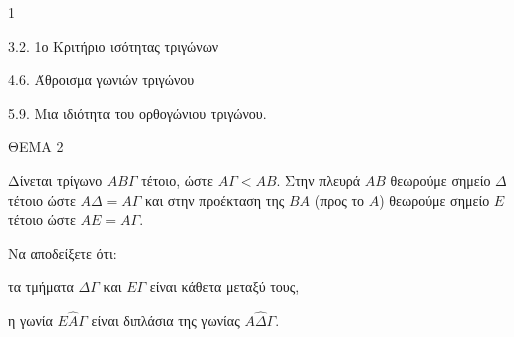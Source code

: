 \begin{ylh}{1}
    \item 3.2. 1ο Κριτήριο ισότητας τριγώνων
    \item 4.6. Άθροισμα γωνιών τριγώνου
    \item 5.9. Μια ιδιότητα του ορθογώνιου τριγώνου.
\end{ylh}

ΘΕΜΑ 2

Δίνεται τρίγωνο $ΑΒ\Gamma$ τέτοιο, ώστε $A\Gamma < AB$. Στην πλευρά $AB$ θεωρούμε σημείο $\Delta$ τέτοιο ώστε $A\Delta = A\Gamma$ και στην προέκταση της $BA$ (προς το $A$) θεωρούμε σημείο $E$ τέτοιο ώστε $AE = A\Gamma$.

Να αποδείξετε ότι:

\begin{alist}
\item τα τμήματα $\Delta\Gamma$ και $E\Gamma$ είναι κάθετα μεταξύ τους, 
\item η γωνία $E\widehat{A}\Gamma$ είναι διπλάσια της γωνίας $A\widehat{\Delta}\Gamma$. 

\begin{center}
\end{center}
\end{alist}
